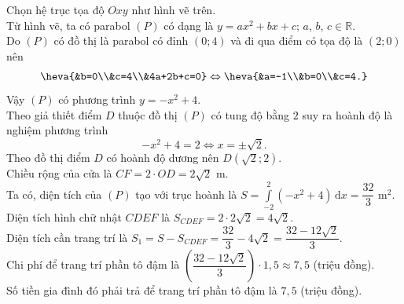 \begin{ex}
{\begin{center}
		\end{center}
		Chọn hệ trục tọa độ $Oxy$ như hình vẽ trên.\\
		Từ hình vẽ, ta có parabol $(P)$ có dạng là $y=ax^2+bx+c$; $a$,  $b$, $c\in \mathbb{R}$.\\
		Do $(P)$ có đồ thị là parabol có đỉnh $(0;4)$ và đi qua điểm có tọa độ là $(2;0)$ nên
		$$\heva{&b=0\\&c=4\\&4a+2b+c=0}\Leftrightarrow \heva{&a=-1\\&b=0\\&c=4.}$$
		Vậy $(P)$ có phương trình $y=-x^2+4$.\\
		Theo giả thiết điểm $D$ thuộc đồ thị $(P)$ có tung độ bằng $2$ suy ra hoành độ là nghiệm phương trình
		$$-x^2+4=2\Leftrightarrow x=\pm\sqrt{2}.$$
		Theo đồ thị điểm $D$ có hoành độ dương nên $D(\sqrt{2};2)$.\\
		Chiều rộng của cửa là $CF=2\cdot OD=2\sqrt{2}$ m.\\
		Ta có, diện tích của $(P)$ tạo với trục hoành là $S=\displaystyle\int \limits_{-2}^{2}(-x^2+4)\mathrm{\,d}x=\dfrac{32}{3}$ m$^2$.\\
		Diện tích hình chữ nhật $CDEF$ là $S_{CDEF}=2\cdot 2\sqrt{2}=4\sqrt{2}$.\\
		Diện tích cần trang trí là $S_1=S-S_{CDEF}=\dfrac{32}{3}-4\sqrt{2}=\dfrac{32-12\sqrt{2}}{3}$.\\
		Chi phí để trang trí phần tô đậm là $\left(\dfrac{32-12\sqrt{2}}{3}\right)\cdot 1{,}5\approx7{,}5$ (triệu đồng).\\
		Số tiền gia đình đó phải trả để trang trí phần tô đậm là $7{,}5$ (triệu đồng).
	}
\end{ex}

